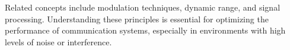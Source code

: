 Related concepts include modulation techniques, dynamic range, and signal processing. Understanding these principles is essential for optimizing the performance of communication systems, especially in environments with high levels of noise or interference.

